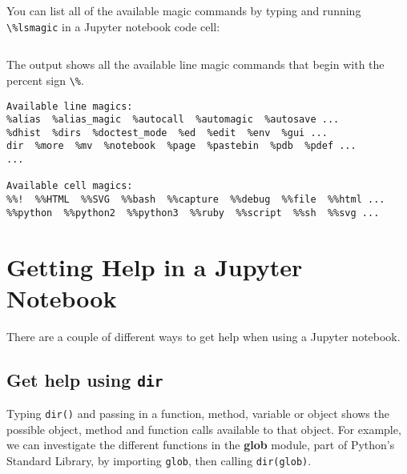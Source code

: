 \documentclass{book}
\newcommand{\passthrough}[1]{#1}
\begin{document}
You can list all of the available magic commands by typing and running
\passthrough{\lstinline!\%lsmagic!} in a Jupyter notebook code cell:

\begin{lstlisting}[language=Python]
%lsmagic
\end{lstlisting}

The output shows all the available line magic commands that begin with
the percent sign \passthrough{\lstinline!\%!}.

\begin{lstlisting}
Available line magics:
%alias  %alias_magic  %autocall  %automagic  %autosave ...
%dhist  %dirs  %doctest_mode  %ed  %edit  %env  %gui ...
dir  %more  %mv  %notebook  %page  %pastebin  %pdb  %pdef ...
...

Available cell magics:
%%!  %%HTML  %%SVG  %%bash  %%capture  %%debug  %%file  %%html ...
%%python  %%python2  %%python3  %%ruby  %%script  %%sh  %%svg ...
\end{lstlisting}
    




    
        \hypertarget{getting-help-in-a-jupyter-notebook}{%
\section{Getting Help in a Jupyter
Notebook}\label{getting-help-in-a-jupyter-notebook}}
    




    
        There are a couple of different ways to get help when using a Jupyter
notebook.
    




    
        \hypertarget{get-help-using-dir}{%
\subsection{\texorpdfstring{Get help using
\texttt{dir}}{Get help using dir}}\label{get-help-using-dir}}

Typing \passthrough{\lstinline!dir()!} and passing in a function,
method, variable or object shows the possible object, method and
function calls available to that object. For example, we can investigate
the different functions in the \textbf{glob} module, part of Python's
Standard Library, by importing \passthrough{\lstinline!glob!}, then
calling \passthrough{\lstinline!dir(glob)!}.
    
\end{document}
